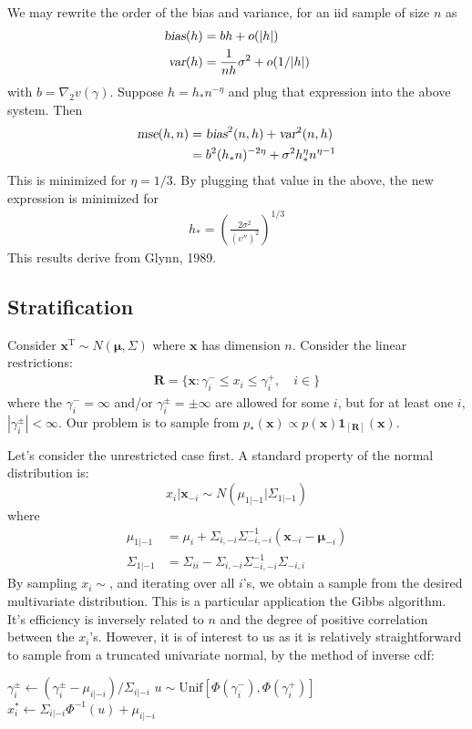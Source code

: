 \documentclass{article}
\begin{document}
We may rewrite the order of the bias and variance, for an iid sample
of size $n$ as
\begin{align}
\textsl{bias}(h)& = b h+o(|h|)\\
\textsl{var}(h)& = \frac{1}{n h}\sigma^2 +o(1/|h|)
\end{align}with $b=\nabla_2 v(\gamma)$. Suppose $h=h_* n^{-\eta}$
and plug that expression into the above system. Then
\begin{align}
\textsl{mse}(h,n)&=\textsl{bias}^2(n,h)+\textsl{var}^2(n,h)\\
&=b^2 (h_* n)^{-2\eta}+\sigma^2 h_*^{\eta}n^{\eta-1}
\end{align}This is minimized for $\eta=1/3$. By plugging that value
in the above, the new expression is minimized for
\begin{align}
h_*=\left(\frac{2\sigma^2}{(\upsilon'')^2}\right)^{1/3}
\end{align}This results derive from Glynn, 1989.

\subsection{Stratification}
Consider $\mathbf{x}^{\mathrm{T}}\sim N(\boldsymbol{\mu},\Sigma)$
where $\mathbf{x}$ has dimension $n$. Consider the linear
restrictions:
\begin{align}
\mathbf{R}=\{\mathbf{x}:\gamma_i^{-}\leq x_i \leq
\gamma_{i}^{+},\quad i\in \}
\end{align}where the $\gamma_i^{-}=\infty$ and/or
$\gamma_i^{\pm}=\pm\infty$ are allowed for some $i$, but for at
least one $i$, $|\gamma_i^{\pm}|<\infty$. Our problem is to sample
from $p_*(\mathbf{x})\propto
p(\mathbf{x})\boldsymbol{1}_{[\mathbf{R}]}(\mathbf{x})$.

Let's consider the unrestricted case first. A standard property of
the normal distribution is:
\begin{equation}
x_i|\mathbf{x}_{-i}\sim N(\mu_{1|-1}|\Sigma_{1|-1})
\end{equation}where
\begin{align}
\mu_{1|-1}&=\mu_i+\Sigma_{i,- i}\Sigma_{-i,-i}^{-1}(\mathbf{x}_{-
i}-\boldsymbol{\mu}_{-i})\\ \Sigma_{1|-1}&=\Sigma_{ii}-\Sigma_{i,-
i}\Sigma_{-i,-i}^{-1}\Sigma_{-i,i}
\end{align}
By sampling $x_i\sim $, and iterating over all $i$'s, we obtain a
sample from the desired multivariate distribution. This is a
particular application the Gibbs algorithm. It's efficiency is
inversely related to $n$ and the degree of positive correlation
between the $x_i$'s. However, it is of interest to us as it is
relatively straightforward to sample from a truncated univariate
normal, by the method of inverse cdf:
\begin{algorithmic}
\STATE $\gamma_i^{\pm}\leftarrow
(\gamma_i^{\pm}-\mu_{i|-i})/\Sigma_{i|-i}$ \STATE
$u\sim\mathrm{Unif}[\Phi(\gamma_i^{-}),\Phi(\gamma_i^{+})]$ \STATE $
x_i^*\leftarrow \Sigma_{i|-i}\Phi^{-1}(u)+\mu_{i|-i}$
\end{algorithmic}
\end{document}

